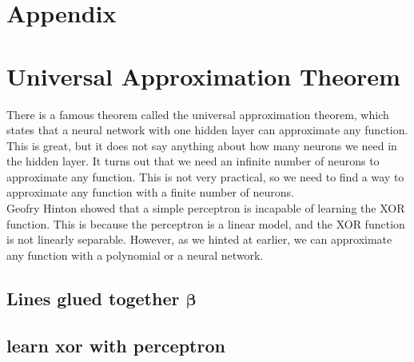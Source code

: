 \documentclass[twoside,11pt]{report}
\begin{document}




%
%
\newpage
\appendix
{}%
\section*{Appendix}
\label{app:appendix}


\section{ Universal Approximation Theorem }
\label{sec:UAT}

There is a famous theorem called the universal approximation theorem, which states that a neural network with one hidden
layer can approximate any function. This is great, but it does not say anything about how many neurons we need in the
hidden layer. It turns out that we need an infinite number of neurons to approximate any function. This is not very
practical, so we need to find a way to approximate any function with a finite number of neurons.\\

Geofry Hinton showed that a simple perceptron is incapable of learning the XOR function. 
This is because the perceptron is a linear model, and the XOR function is not linearly separable. 
However, as we hinted at earlier, we can approximate any function with a polynomial or a neural network.



%
\subsection*{Lines glued together $\boldsymbol{\beta}$}
\label{app:OptimalBeta}




%
\subsection*{learn xor with perceptron}
\label{app:OptimalBeta}











\vskip 0.2in

% 

%
\end{document}
